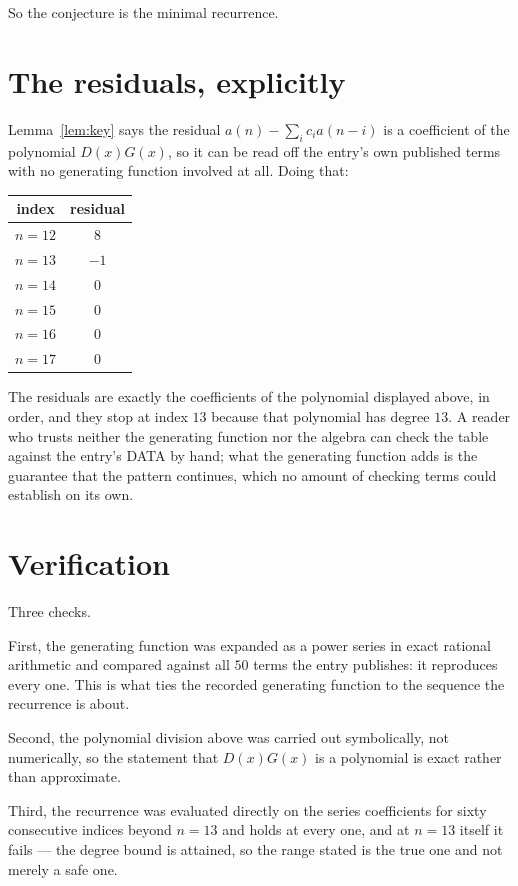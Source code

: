 \documentclass[11pt,a4paper]{article}
\theoremstyle{plain}
\theoremstyle{definition}
\begin{document}
So the conjecture is the minimal recurrence.

\section{The residuals, explicitly}

Lemma~\ref{lem:key} says the residual $a(n)-\sum_ic_ia(n-i)$ is a coefficient of the
polynomial $D(x)G(x)$, so it can be read off the entry's own published terms with no
generating function involved at all. Doing that:
\begin{center}
\begin{tabular}{cc}
index & residual \\ \hline
$n=12$ & $8$ \\
$n=13$ & $-1$ \\
$n=14$ & $0$ \\
$n=15$ & $0$ \\
$n=16$ & $0$ \\
$n=17$ & $0$
\end{tabular}
\end{center}
The residuals are exactly the coefficients of the polynomial displayed above, in order, and
they stop at index $13$ because that polynomial has degree $13$. A reader who trusts
neither the generating function nor the algebra can check the table against the entry's DATA
by hand; what the generating function adds is the guarantee that the pattern continues, which
no amount of checking terms could establish on its own.

\section{Verification}

Three checks.

First, the generating function was expanded as a power series in exact rational arithmetic and
compared against all $50$ terms the entry publishes: it reproduces every one. This is
what ties the recorded generating function to the sequence the recurrence is about.

Second, the polynomial division above was carried out symbolically, not numerically, so the
statement that $D(x)G(x)$ is a polynomial is exact rather than approximate.

Third, the recurrence was evaluated directly on the series coefficients for sixty consecutive
indices beyond $n=13$ and holds at every one, and at $n=13$ itself it fails --- the
degree bound is attained, so the range stated is the true one and not merely a safe one.
\end{document}
